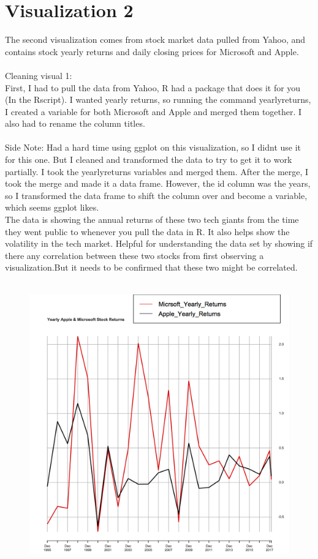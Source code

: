 \documentclass{article}
\begin{document}
\section{Visualization 2}


The second visualization comes from stock market data pulled from Yahoo, and contains stock yearly returns and daily closing prices for Microsoft and Apple.\\
\\
Cleaning visual 1:\\
First, I had to pull the data from Yahoo, R had a package that does it for you (In the Rscript). I wanted yearly returns, so running the command yearlyreturns, I created a variable for both Microsoft and Apple and merged them together. I also had to rename the column titles.\\
\\
Side Note: Had a hard time using ggplot on this visualization, so I didnt use it for this one. But I cleaned and transformed the data to try to get it to work partially. I took the yearlyreturns variables and merged them. After the merge, I took the merge and made it a data frame. However, the id column was the years, so I transformed the data frame to shift the column over and become a variable, which seems ggplot likes. 
\\
The data is showing the annual returns of these two tech giants from the time they went public to whenever you pull the data in R. It also helps show the volatility  in the tech market.  Helpful for understanding the data set by showing if there any correlation between these two stocks from first observing a visualization.But it needs to be confirmed that these two might be correlated.\\
\\
\begin{figure}[H]
\centering
\includegraphics[scale=.8]{Visual_2_1_PS6.png}
\end{figure}
\end{document}
